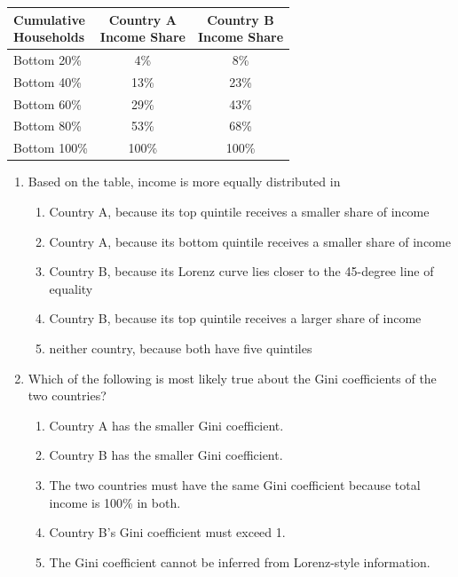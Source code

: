\documentclass[10pt]{article}
\newenvironment{choiceslist}
  {\begin{enumerate}[label=(\Alph*), leftmargin=1.6em, itemsep=0.12em, topsep=0.18em, parsep=0pt]}
  {\end{enumerate}}
\newenvironment{stimulus}
  {\begin{center}\begin{minipage}{0.96\columnwidth}\footnotesize\itshape\setlength{\tabcolsep}{3pt}\renewcommand{\arraystretch}{0.96}}
  {\end{minipage}\end{center}}
\begin{document}
\begin{multicols*}{2}
\begin{stimulus}
\begin{center}
\begin{tabular}{lcc}
\toprule
\shortstack{Cumulative\\ Households} & \shortstack{Country A\\ Income Share} & \shortstack{Country B\\ Income Share} \\
\midrule
Bottom 20\% & 4\% & 8\% \\
Bottom 40\% & 13\% & 23\% \\
Bottom 60\% & 29\% & 43\% \\
Bottom 80\% & 53\% & 68\% \\
Bottom 100\% & 100\% & 100\% \\
\bottomrule
\end{tabular}
\end{center}
\end{stimulus}
\begin{enumerate}[resume*=apq, leftmargin=*, itemsep=0.85em, topsep=0.2em, parsep=0pt]
\item Based on the table, income is more equally distributed in
\begin{choiceslist}
\item Country A, because its top quintile receives a smaller share of income
\item Country A, because its bottom quintile receives a smaller share of income
\item Country B, because its Lorenz curve lies closer to the 45-degree line of equality
\item Country B, because its top quintile receives a larger share of income
\item neither country, because both have five quintiles
\end{choiceslist}
\item Which of the following is most likely true about the Gini coefficients of the two countries?
\begin{choiceslist}
\item Country A has the smaller Gini coefficient.
\item Country B has the smaller Gini coefficient.
\item The two countries must have the same Gini coefficient because total income is 100\% in both.
\item Country B's Gini coefficient must exceed 1.
\item The Gini coefficient cannot be inferred from Lorenz-style information.
\end{choiceslist}

\end{enumerate}
\end{multicols*}
\end{document}
